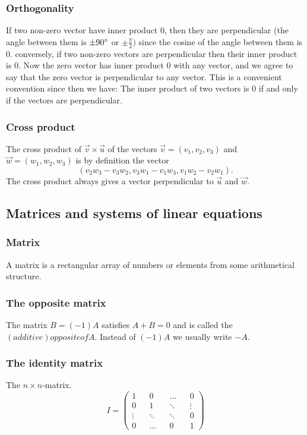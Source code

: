 \documentclass{article}
\begin{document}
		\subsubsection{Orthogonality}
		If two non-zero vector have inner product 0, then they are perpendicular (the angle between them is $\pm 90\degree$ or $\pm\frac{\pi}{2})$ since the cosine of the angle between them is 0. conversely, if two non-zero vectors are perpendicular then their inner product is 0. Now the zero vector has inner product 0 with any vector, and we agree to say that the zero vector is perpendicular to any vector. This is a convenient convention since then we have: The inner product of two vectors is 0 if and only if the vectors are perpendicular.
		
		\subsubsection{Cross product}
		The cross product of $\vec{v}\times\vec{u}$ of the vectors $\vec{v} = (v_1, v_2, v_3)$ and $\vec{w} = (w_1, w_2, w_3)$ is by definition the vector
		\begin{equation*}
			(v_2w_3 - v_3w_2, v_3w_1 - v_1w_3, v_1w_2 - v_2w_1).
		\end{equation*}
		The cross product always gives a vector perpendicular to $\vec{u}$ and $\vec{w}$.
		
		\subsection{Matrices and systems of linear equations}
			\subsubsection{Matrix}
			A matrix is a rectangular array of numbers or elements from some arithmetical structure.
			
			\subsubsection{The opposite matrix}
			The matrix $B = (-1)A$ satisfies $A+B=0$ and is called the $(additive) opposite of A$. Instead of $(-1)A$ we usually write $-A$.
			
			\subsubsection{The identity matrix}
			The $n\times n$-matrix.
			\begin{equation*}
				I = \begin{pmatrix}
					1 && 0 && \dots && 0 \\
					0 && 1 && \ddots && \vdots\\
					\vdots && \ddots && \ddots && 0 \\
					0 && \dots && 0 && 1
				\end{pmatrix}
			\end{equation*}
			
\end{document}
